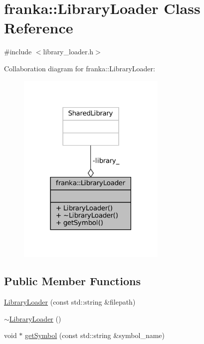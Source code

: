 \hypertarget{classfranka_1_1LibraryLoader}{}\section{franka\+:\+:Library\+Loader Class Reference}
\label{classfranka_1_1LibraryLoader}


{\ttfamily \#include $<$library\+\_\+loader.\+h$>$}



Collaboration diagram for franka\+:\+:Library\+Loader\+:
\nopagebreak
\begin{figure}[H]
\begin{center}
\leavevmode
\includegraphics[width=201pt]{classfranka_1_1LibraryLoader__coll__graph}
\end{center}
\end{figure}
\subsection*{Public Member Functions}
\begin{DoxyCompactItemize}
\item 
\hyperlink{classfranka_1_1LibraryLoader_aa971ea69a2dab305b1be14b39e74c4ea}{Library\+Loader} (const std\+::string \&filepath)
\item 
\hyperlink{classfranka_1_1LibraryLoader_afe13947a39603d6ba07a4c93bd5d7650}{$\sim$\+Library\+Loader} ()
\item 
void $\ast$ \hyperlink{classfranka_1_1LibraryLoader_aa1ca9b340a61553992e9bc43d04c5376}{get\+Symbol} (const std\+::string \&symbol\+\_\+name)
\end{DoxyCompactItemize}
